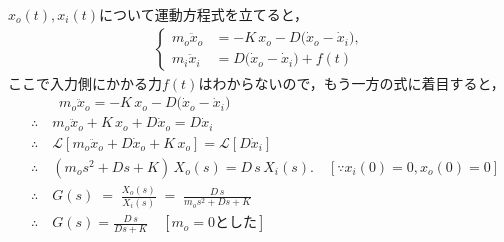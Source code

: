 \documentclass[a4paper,12pt]{article}
\begin{document}
\begin{tcolorbox}
    \({x}_o(t),{x}_i(t)\)について運動方程式を立てると，
    \begin{align*}
        \left\{
            \begin{aligned}
                m_o \ddot{x}_o &= -K\,x_o - D\bigl(\dot{x}_o-\dot{x}_i\bigr),\\
                m_i \ddot{x}_i &= D\bigl(\dot{x}_o-\dot{x}_i\bigr) + f(t)
            \end{aligned}
        \right.
    \end{align*}
        ここで入力側にかかる力\(f(t)\)はわからないので，もう一方の式に着目すると，
    \begin{align*}
        &\qquad m_o \ddot{x}_o = -K\,x_o - D\bigl(\dot{x}_o-\dot{x}_i\bigr) \\
        &\therefore \quad m_o \ddot{x}_o + K\,x_o + D \dot{x}_o=D \dot{x}_i \\
        &\therefore \quad \mathcal{L} \left[  m_o \ddot{x}_o + D \dot{x}_o + K\,x_o  \right] 
        =\mathcal{L} \left[ D \dot{x}_i \right] \\
        &\therefore \quad (m_o s^2 + D s + K)\,X_o(s) = D\,s\,X_i(s). \quad [\because x_i(0)= 0, x_o(0)=0 ]\\
        &\therefore \quad G(s) \;=\;\frac{X_o(s)}{X_i(s)}
        \;=\;\frac{D\,s}{m_o s^2 + D s + K}\\
        &\therefore \quad G(s) = \frac{D\,s}{ D s + K} \quad [m_o=0 \text{とした} ]
    \end{align*}

\end{tcolorbox}
\newpage
\end{document}
